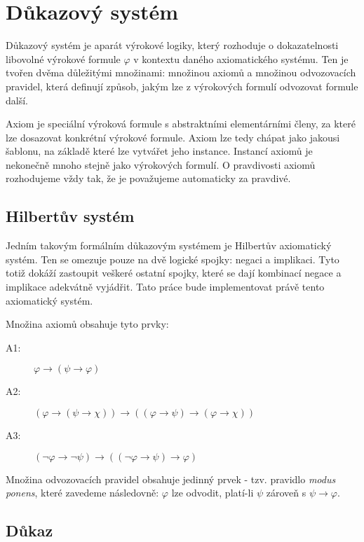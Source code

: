 \documentclass[thesis=B,czech]{FITthesis}[2012/06/26]
\begin{document}
\section{Důkazový systém}

Důkazový systém je aparát výrokové logiky, který rozhoduje o dokazatelnosti libovolné výrokové formule $\varphi$ v kontextu daného axiomatického systému. Ten je tvořen dvěma důležitými množinami: množinou axiomů a množinou odvozovacích pravidel, která  definují způsob, jakým lze z výrokových formulí odvozovat formule další.

Axiom je speciální výroková formule s abstraktními elementárními členy, za které lze dosazovat konkrétní výrokové formule. Axiom lze tedy chápat jako jakousi šablonu, na základě které lze vytvářet jeho instance. Instancí axiomů je nekonečně mnoho stejně jako výrokových formulí. O pravdivosti axiomů rozhodujeme vždy tak, že je považujeme automaticky za pravdivé.

\subsection{Hilbertův systém}

Jedním takovým formálním důkazovým systémem je Hilbertův axiomatický systém. Ten se omezuje pouze na dvě logické spojky: negaci a implikaci. Tyto totiž dokáží zastoupit veškeré ostatní spojky, které se dají kombinací negace a implikace adekvátně vyjádřit. Tato práce bude implementovat právě tento axiomatický systém.

Množina axiomů obsahuje tyto prvky:

\begin{description}
\item[A1:] $\varphi\rightarrow(\psi\rightarrow\varphi)$
\item[A2:] $(\varphi\rightarrow(\psi\rightarrow\chi))\rightarrow((\varphi\rightarrow\psi)\rightarrow(\varphi\rightarrow\chi))$
\item[A3:] $(\neg\varphi\rightarrow\neg\psi)\rightarrow((\neg\varphi\rightarrow\psi)\rightarrow\varphi)$
\end{description}

Množina odvozovacích pravidel obsahuje jedinný prvek - tzv. pravidlo \emph{modus ponens}, které zavedeme následovně: $\varphi$ lze odvodit, platí-li $\psi$ zároveň s $\psi\rightarrow\varphi$.

\subsection{Důkaz}
\end{document}
